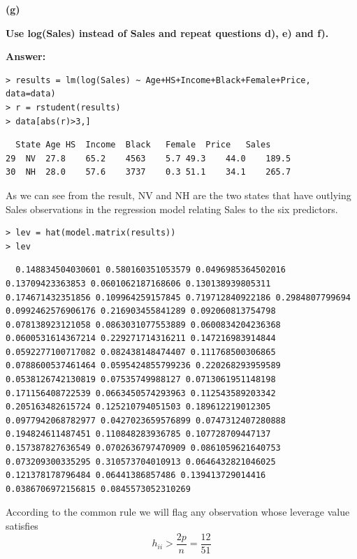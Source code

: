 \documentclass[letterpaper,11pt]{article}
\begin{document}
\begin{addmargin}[-1.1em]{0em}
  \textbf{(g)}\par
\end{addmargin}
\textbf{Use log(Sales) instead of Sales and repeat questions d), e) and f).}\par
\bigbreak
\begin{addmargin}[-0.5em]{0em}
  \textbf{Answer: }
\end{addmargin}

\begin{lstlisting}
> results = lm(log(Sales) ~ Age+HS+Income+Black+Female+Price, data=data)
> r = rstudent(results)
> data[abs(r)>3,]
\end{lstlisting}

\begin{lstlisting}
  State	Age	HS	Income	Black	Female	Price	Sales
29	NV	27.8	65.2	4563	5.7	49.3	44.0	189.5
30	NH	28.0	57.6	3737	0.3	51.1	34.1	265.7
\end{lstlisting}

As we can see from the result, NV and NH are the two states that have outlying Sales observations in the regression model relating Sales to the six predictors.

\begin{lstlisting}
> lev = hat(model.matrix(results))
> lev
\end{lstlisting}

\begin{lstlisting}
  0.148834504030601 0.580160351053579 0.0496985364502016 0.13709423363853 0.0601062187168606 0.130138939805311 0.174671432351856 0.109964259157845 0.719712840922186 0.2984807799694 0.0992462576906176 0.216903455841289 0.092060813754798 0.078138923121058 0.0863031077553889 0.0600834204236368 0.0600531614367214 0.229271714316211 0.147216983914844 0.0592277100717082 0.082438148474407 0.111768500306865 0.0788600537461464 0.0595424855799236 0.220268293959589 0.0538126742130819 0.07535749988127 0.0713061951148198 0.171156408722539 0.0663450574293963 0.112543589203342 0.205163482615724 0.125210794051503 0.189612219012305 0.0977942068782977 0.0427023659576899 0.0747312407280888 0.194824611487451 0.110848283936785 0.107728709447137 0.157387827636549 0.0702636797470909 0.0861059621640753 0.073209300335295 0.310573704010913 0.0646432821046025 0.121378178796484 0.06441386857486 0.139413729014416 0.0386706972156815 0.0845573052310269
\end{lstlisting}

According to the common rule we will flag any observation whose leverage value satisfies
$$h_{ii} > \frac{2p}{n} = \frac{12}{51}$$
\end{document}
